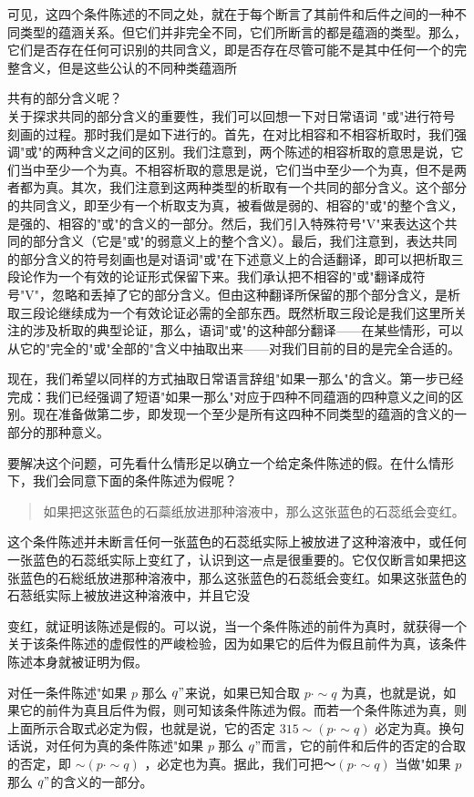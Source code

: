 可见，这四个条件陈述的不同之处，就在于每个断言了其前件和后件之间的一种不同类型的蕴涵关系。但它们并非完全不同，它们所断言的都是蕴涵的类型。那么，它们是否存在任何可识别的共同含义，即是否存在尽管可能不是其中任何一个的完整含义，但是这些公认的不同种类蕴涵所

共有的部分含义呢？\\
关于探求共同的部分含义的重要性，我们可以回想一下对日常语词 "或"进行符号刻画的过程。那时我们是如下进行的。首先，在对比相容和不相容析取时，我们强调"或"的两种含义之间的区别。我们注意到，两个陈述的相容析取的意思是说，它们当中至少一个为真。不相容析取的意思是说，它们当中至少一个为真，但不是两者都为真。其次，我们注意到这两种类型的析取有一个共同的部分含义。这个部分的共同含义，即至少有一个析取支为真，被看做是弱的、相容的"或"的整个含义，是强的、相容的"或"的含义的一部分。然后，我们引入特殊符号"V"来表达这个共同的部分含义（它是"或"的弱意义上的整个含义）。最后，我们注意到，表达共同的部分含义的符号刻画也是对语词"或"在下述意义上的合适翻译，即可以把析取三段论作为一个有效的论证形式保留下来。我们承认把不相容的"或"翻译成符号"V"，忽略和丢掉了它的部分含义。但由这种翻译所保留的那个部分含义，是析取三段论继续成为一个有效论证必需的全部东西。既然析取三段论是我们这里所关注的涉及析取的典型论证，那么，语词"或"的这种部分翻译——在某些情形，可以从它的"完全的"或"全部的"含义中抽取出来——对我们目前的目的是完全合适的。

现在，我们希望以同样的方式抽取日常语言辞组"如果一那么"的含义。第一步已经完成：我们已经强调了短语"如果一那么"对应于四种不同蕴涵的四种意义之间的区别。现在准备做第二步，即发现一个至少是所有这四种不同类型的蕴涵的含义的一部分的那种意义。

要解决这个问题，可先看什么情形足以确立一个给定条件陈述的假。在什么情形下，我们会同意下面的条件陈述为假呢？

\begin{quote}
如果把这张蓝色的石蘂纸放进那种溶液中，那么这张蓝色的石蕊纸会变红。
\end{quote}

这个条件陈述并未断言任何一张蓝色的石蕊纸实际上被放进了这种溶液中，或任何一张蓝色的石蕊纸实际上变红了，认识到这一点是很重要的。它仅仅断言如果把这张蓝色的石総纸放进那种溶液中，那么这张蓝色的石蕊纸会变红。如果这张蓝色的石䓗纸实际上被放进这种溶液中，并且它没

变红，就证明该陈述是假的。可以说，当一个条件陈述的前件为真时，就获得一个关于该条件陈述的虚假性的严峻检验，因为如果它的后件为假且前件为真，该条件陈述本身就被证明为假。

对任一条件陈述"如果 $p$ 那么 $q"$来说，如果已知合取 $p \cdot \sim q$ 为真，也就是说，如果它的前件为真且后件为假，则可知该条件陈述为假。而若一个条件陈述为真，则上面所示合取式必定为假，也就是说，它的否定 $315 \sim(p \cdot \sim q)$ 必定为真。换句话说，对任何为真的条件陈述"如果 $p$ 那么 $q"$而言，它的前件和后件的否定的合取的否定，即 $\sim(p \cdot \sim q)$ ，必定也为真。据此，我们可把～$(p \cdot \sim q)$ 当做"如果 $p$ 那么 $q"$的含义的一部分。

